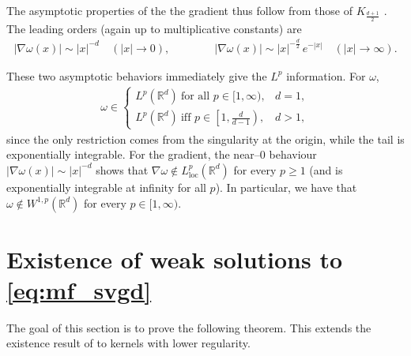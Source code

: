 \documentclass[reqno, 11pt]{amsart}
\numberwithin{equation}{section}
\theoremstyle{definition}
\begin{document}
The asymptotic properties of the the gradient thus follow from those of $K_{\frac{d+1}{2}}$ \cite[Equation (3, 4) and (3, 5)]{aronszajn_smith_1961_theory}. The leading orders (again up to multiplicative constants) are
\begin{align*}
    |\nabla\omega(x)|
    \sim |x|^{-d} \quad (|x|\to 0),
    \qquad\qquad
    |\nabla\omega(x)|
    \sim |x|^{-\frac d2}\,e^{-|x|} \quad (|x|\to\infty).
\end{align*}

These two asymptotic behaviors immediately give the $L^p$ information. For $\omega$,
\begin{align*}
    \omega\in
    \begin{cases}
        L^p(\mathbb{R}^d) \ \text{for all } p\in[1,\infty), & d=1,\\[1mm]
        L^p(\mathbb{R}^d) \ \text{iff } p\in\left[1,\frac{d}{d-1}\right), & d>1,
    \end{cases}
\end{align*}
since the only restriction comes from the singularity at the origin, while the tail is exponentially integrable. For the gradient, the near–$0$ behaviour $|\nabla\omega(x)|\sim |x|^{-d}$ shows that $\nabla\omega\notin L^p_{\mathrm{loc}}(\mathbb{R}^d)$ for every $p\ge 1$ (and is exponentially integrable at infinity for all $p$). In particular, we have that $\omega\notin W^{1,p}(\mathbb{R}^d)$ for every $p\in[1,\infty)$.


\section{Existence of weak solutions to \eqref{eq:mf_svgd}}
\label{app:weak_sol}

The goal of this section is to prove the following theorem. This extends the existence result of \cite[Theorem 2.4]{lu_lu_nolen_2019_scaling} to kernels with lower regularity.
\end{document}
